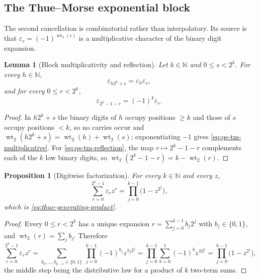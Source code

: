 \documentclass[11pt,oneside]{article}
\newtheorem{proposition}[theorem]{Proposition}
\newtheorem{lemma}[theorem]{Lemma}
\theoremstyle{definition}
\theoremstyle{remark}
\newcommand{\N}{\mathbb N}
\newcommand{\wt}{\operatorname{wt}_2}
\begin{document}
\subsection{The Thue--Morse exponential block}
\label{subsec:qs-thue-morse}

The second cancellation is combinatorial rather than interpolatory.  Its source is that
$\varepsilon_r=(-1)^{\wt(r)}$ is a multiplicative character of the binary digit expansion.

\begin{lemma}[Block multiplicativity and reflection]
\label{lem:qs-tm-block}
Let $k\in\N$ and $0\le s<2^k$.  For every $h\in\N$,
\begin{equation}
 \varepsilon_{h2^k+s}=\varepsilon_h\varepsilon_s,          \label{eq:qs-tm-multiplicative}
\end{equation}
and for every $0\le r<2^k$,
\begin{equation}
 \varepsilon_{2^k-1-r}=(-1)^k\varepsilon_r.               \label{eq:qs-tm-reflection}
\end{equation}
\end{lemma}

\begin{proof}
In $h2^k+s$ the binary digits of $h$ occupy positions $\ge k$ and those of $s$ occupy
positions $<k$, so no carries occur and $\wt(h2^k+s)=\wt(h)+\wt(s)$; exponentiating $-1$
gives \eqref{eq:qs-tm-multiplicative}.  For \eqref{eq:qs-tm-reflection}, the map
$r\mapsto2^k-1-r$ complements each of the $k$ low binary digits, so
$\wt(2^k-1-r)=k-\wt(r)$.
\end{proof}

\begin{proposition}[Digitwise factorization]
\label{prop:qs-tm-factorization}
For every $k\in\N$ and every $z$,
\begin{equation}
 \sum_{r=0}^{2^k-1}\varepsilon_rz^r=\prod_{j=0}^{k-1}\bigl(1-z^{2^j}\bigr), \label{eq:qs-tm-generating}
\end{equation}
which is \eqref{eq:thue-generating-product}.
\end{proposition}

\begin{proof}
Every $0\le r<2^k$ has a unique expansion $r=\sum_{j=0}^{k-1}b_j2^j$ with $b_j\in\{0,1\}$,
and $\wt(r)=\sum_jb_j$.  Therefore
\begin{equation*}
 \sum_{r=0}^{2^k-1}\varepsilon_rz^r
 =\sum_{b_0,\ldots,b_{k-1}\in\{0,1\}}\ \prod_{j=0}^{k-1}(-1)^{b_j}z^{\,b_j2^j}
 =\prod_{j=0}^{k-1}\sum_{b=0}^{1}(-1)^bz^{\,b2^j}
 =\prod_{j=0}^{k-1}\bigl(1-z^{2^j}\bigr),
\end{equation*}
the middle step being the distributive law for a product of $k$ two-term sums.
\end{proof}
\end{document}
